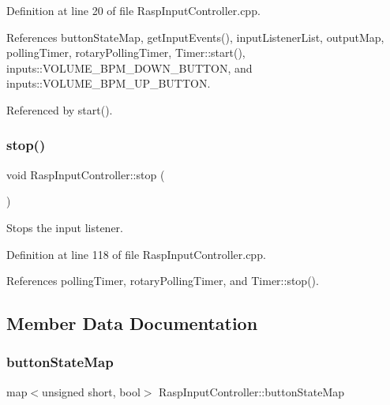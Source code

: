 Definition at line 20 of file Rasp\+Input\+Controller.\+cpp.



References button\+State\+Map, get\+Input\+Events(), input\+Listener\+List, output\+Map, polling\+Timer, rotary\+Polling\+Timer, Timer\+::start(), inputs\+::\+V\+O\+L\+U\+M\+E\+\_\+\+B\+P\+M\+\_\+\+D\+O\+W\+N\+\_\+\+B\+U\+T\+T\+ON, and inputs\+::\+V\+O\+L\+U\+M\+E\+\_\+\+B\+P\+M\+\_\+\+U\+P\+\_\+\+B\+U\+T\+T\+ON.



Referenced by start().

\mbox{\label{class_rasp_input_controller_a7d9523be1a83acde964cb5d2b1d281ed}} 
\subsubsection{\texorpdfstring{stop()}{stop()}}
{\footnotesize\ttfamily void Rasp\+Input\+Controller\+::stop (\begin{DoxyParamCaption}{ }\end{DoxyParamCaption})}

Stops the input listener. 

Definition at line 118 of file Rasp\+Input\+Controller.\+cpp.



References polling\+Timer, rotary\+Polling\+Timer, and Timer\+::stop().



\subsection{Member Data Documentation}
\mbox{\label{class_rasp_input_controller_ae02dcbb81abe6b6e6e3eaaeef4f3bf4a}} 
\subsubsection{\texorpdfstring{button\+State\+Map}{buttonStateMap}}
{\footnotesize\ttfamily map$<$unsigned short, bool$>$ Rasp\+Input\+Controller\+::button\+State\+Map\hspace{0.3cm}{\ttfamily [private]}}

